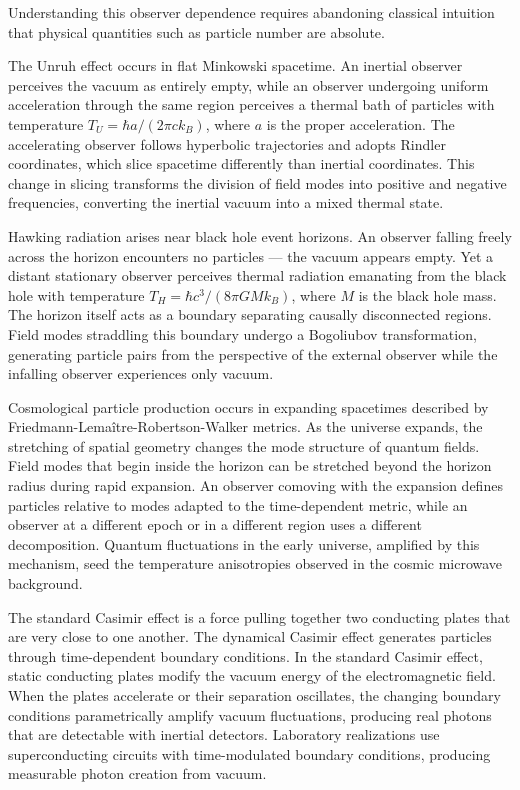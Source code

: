 Understanding this observer dependence requires abandoning classical intuition that physical quantities such as particle number are absolute.

The Unruh effect occurs in flat Minkowski spacetime. An inertial observer perceives the vacuum as entirely empty, while an observer undergoing uniform acceleration through the same region perceives a thermal bath of particles with temperature $T_U = \hbar a/(2\pi c k_B)$, where $a$ is the proper acceleration. The accelerating observer follows hyperbolic trajectories and adopts Rindler coordinates, which slice spacetime differently than inertial coordinates. This change in slicing transforms the division of field modes into positive and negative frequencies, converting the inertial vacuum into a mixed thermal state.

Hawking radiation arises near black hole event horizons. An observer falling freely across the horizon encounters no particles — the vacuum appears empty. Yet a distant stationary observer perceives thermal radiation emanating from the black hole with temperature $T_H = \hbar c^3/(8\pi G M k_B)$, where $M$ is the black hole mass. The horizon itself acts as a boundary separating causally disconnected regions. Field modes straddling this boundary undergo a Bogoliubov transformation, generating particle pairs from the perspective of the external observer while the infalling observer experiences only vacuum.

Cosmological particle production occurs in expanding spacetimes described by Friedmann-Lemaître-Robertson-Walker metrics. As the universe expands, the stretching of spatial geometry changes the mode structure of quantum fields. Field modes that begin inside the horizon can be stretched beyond the horizon radius during rapid expansion. An observer comoving with the expansion defines particles relative to modes adapted to the time-dependent metric, while an observer at a different epoch or in a different region uses a different decomposition. Quantum fluctuations in the early universe, amplified by this mechanism, seed the temperature anisotropies observed in the cosmic microwave background.

The standard Casimir effect is a force pulling together two conducting plates that are very close to one another. The dynamical Casimir effect generates particles through time-dependent boundary conditions. In the standard Casimir effect, static conducting plates modify the vacuum energy of the electromagnetic field. When the plates accelerate or their separation oscillates, the changing boundary conditions parametrically amplify vacuum fluctuations, producing real photons that are detectable with inertial detectors. Laboratory realizations use superconducting circuits with time-modulated boundary conditions, producing measurable photon creation from vacuum.

